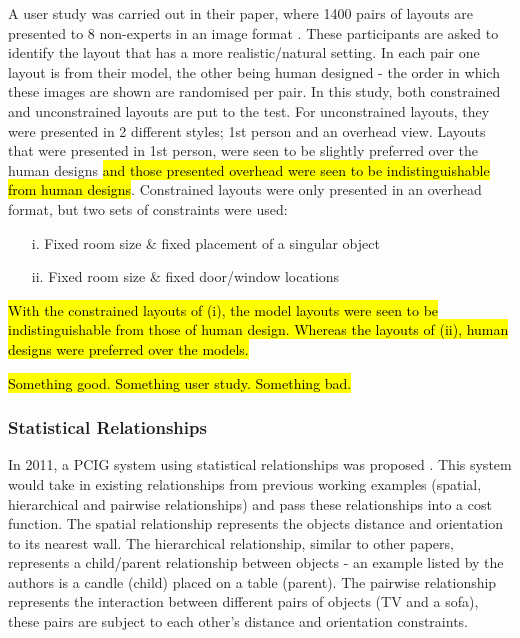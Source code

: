 A user study was carried out in their paper, where 1400 pairs of layouts are presented to 8 non-experts in an image format \cite{constrained-layouts}. These participants are asked to identify the layout that has a more realistic/natural setting. In each pair one layout is from their model, the other being human designed - the order in which these images are shown are randomised per pair.
In this study, both constrained and unconstrained layouts are put to the test. For unconstrained layouts, they were presented in 2 different styles; 1st person and an overhead view. Layouts that were presented in 1st person, were seen to be slightly preferred over the human designs \hl{and those presented overhead were seen to be indistinguishable from human designs}.
Constrained layouts were only presented in an overhead format, but two sets of constraints were used:
\begin{enumerate}
    \item[i.] Fixed room size \& fixed placement of a singular object
    \item[ii.] Fixed room size \& fixed door/window locations
\end{enumerate}
\hl{With the constrained layouts of (i), the model layouts were seen to be indistinguishable from those of human design. Whereas the layouts of (ii), human designs were preferred over the models.}

\hl{Something good. Something user study. Something bad.}

\subsubsection*{Statistical Relationships}
In 2011, a PCIG system using statistical relationships was proposed \cite{make-it-home}.
This system would take in existing relationships from previous working examples (spatial, hierarchical and pairwise relationships) and pass these relationships into a cost function.
The spatial relationship represents the objects distance and orientation to its nearest wall. The hierarchical relationship, similar to other papers, represents a child/parent relationship between objects - an example listed by the authors is a candle (child) placed on a table (parent).
The pairwise relationship represents the interaction between different pairs of objects (TV and a sofa), these pairs are subject to each other's distance and orientation constraints.


